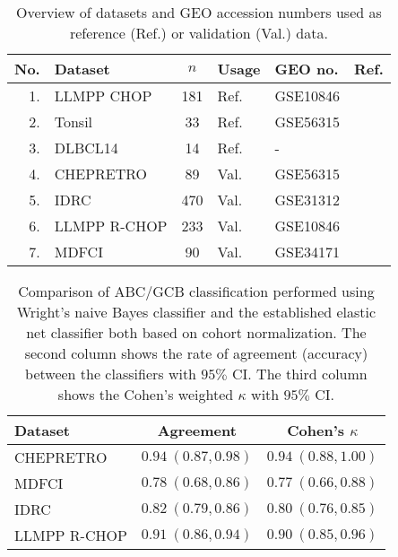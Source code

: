 \documentclass[twocolumn]{bmcart}%
\begin{document}
\begin{backmatter}
\begin{table}[!h]%
{\footnotesize
\caption{Overview of datasets and GEO accession numbers used as reference (Ref.) or validation (Val.) data.}
\label{table:01}%
\begin{center}
\begin{tabular}{rlclll}
\hline
No. & Dataset & $n$ & Usage & GEO no. & Ref.
\\
\hline
1. & LLMPP CHOP & 181 & Ref. & GSE10846 & \citep{Lenz2008a}
\\
2. & Tonsil & 33 & Ref. & GSE56315 & \citep{DybkaerBoegsted2015}
\\
3. & DLBCL14 & 14 & Ref. & - & \citep{Falgreen2015}
\\
4. & CHEPRETRO & 89 & Val. & GSE56315 & \citep{DybkaerBoegsted2015}
\\
5. & IDRC & 470 & Val. & GSE31312 & \citep{Visco2012}
\\
6. & LLMPP R-CHOP & 233 & Val. & GSE10846 & \citep{Lenz2008a}
\\
7. & MDFCI & 90 & Val. & GSE34171 & \citep{Monti2012a}\\
\hline
\end{tabular}
\end{center}
}
\end{table}


\begin{table}[!h]%
{\small
\caption{Comparison of ABC/GCB classification performed using Wright's naive
Bayes classifier \citep{Wright2003} and the established elastic net classifier
both based on cohort normalization. The second column shows the rate of agreement (accuracy) between the
classifiers with $95\%$ CI. The third column shows the Cohen's weighted
$\kappa$ with $95\%$ CI.\label{tab:ABCGCBclassifier}}
\begin{center}
\begin{tabular}{lll}
\hline
\multicolumn{1}{l}{Dataset}&\multicolumn{1}{c}{Agreement}&\multicolumn{1}{c}{Cohen's $\kappa$}\tabularnewline
\hline
CHEPRETRO&$0.94~(0.87, 0.98)$&$0.94~(0.88, 1.00)$\tabularnewline
MDFCI&$0.78~(0.68, 0.86)$&$0.77~(0.66, 0.88)$\tabularnewline
IDRC&$0.82~(0.79, 0.86)$&$0.80~(0.76, 0.85)$\tabularnewline
LLMPP R-CHOP&$0.91~(0.86, 0.94)$&$0.90~(0.85, 0.96)$\tabularnewline
\hline
\end{tabular}\end{center}}

\end{table}



\end{backmatter}
\end{document}

